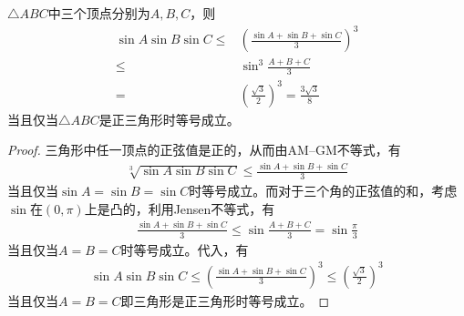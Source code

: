 \begin{theorem}
  $\triangle ABC$中三个顶点分别为$A,B,C$，则
  \begin{align*}
    \sin A \sin B \sin C \le{}& \left(\frac{\sin A + \sin B + \sin C}3\right)^3\\
                         \le{}& \sin^3\frac{A+B+C}3\\
                             =& \left(\frac{\sqrt3}{2}\right)^3 = \frac{3\sqrt3}{8}
  \end{align*}
  当且仅当$\triangle ABC$是正三角形时等号成立。
\end{theorem}
\begin{proof}
  三角形中任一顶点的正弦值是正的，从而由AM--GM不等式，有
  \begin{align*}
    \sqrt[3]{\sin A \sin B \sin C} \le \frac{\sin A + \sin B + \sin C}{3} 
  \end{align*}
  当且仅当$\sin A=\sin B=\sin C$时等号成立。而对于三个角的正弦值的和，考虑$\sin$在$(0,\pi)$上是凸的，利用Jensen不等式，有
  \begin{align*}
         && \frac{\sin A + \sin B + \sin C}{3} \le \sin \frac{A + B + C}{3} = \sin \frac{\pi}{3}
  \end{align*}
  当且仅当$A = B = C$时等号成立。代入，有
  \begin{align*}
    \sin A \sin B \sin C \le \left( \frac{\sin A + \sin B + \sin C}{3} \right)^3 \le \left( \frac{\sqrt3}{2} \right)^3
  \end{align*}
  当且仅当$A=B=C$即三角形是正三角形时等号成立。


\end{proof}
